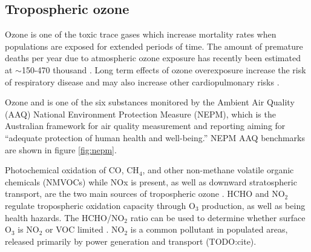 \subsection{Tropospheric ozone}


Ozone is one of the toxic trace gases which increase mortality rates when populations are exposed for extended periods of time.
The amount of premature deaths per year due to atmospheric ozone exposure has recently been estimated at $\sim$150-470 thousand \cite{Silva_2013, Lelieveld_2015}.
Long term effects of ozone overexposure increase the risk of respiratory disease and may also increase other cardiopulmonary risks \cite{Jerrett_2009}.

Ozone and is one of the six substances monitored by the Ambient Air Quality (AAQ) National Environment Protection Measure (NEPM), which is the Australian framework for air quality measurement and reporting aiming for ``adequate protection of human health and well-being.''
NEPM AAQ benchmarks are shown in figure \ref{fig:nepm}.

Photochemical oxidation of CO, CH$_4$, and other non-methane volatile organic chemicals (NMVOCs) while NOx is present, as well as downward stratospheric transport, are the two main sources of tropospheric ozone \cite{Stevenson_2006}.
HCHO and NO$_2$ regulate tropospheric oxidation capacity through O$_3$ production, as well as being health hazards.
The HCHO/NO$_2$ ratio can be used to determine whether surface O$_3$ is NO$_2$ or VOC limited \cite{Mahajan_2015}.
NO$_2$ is a common pollutant in populated areas, released primarily by power generation and transport (TODO:cite). 

